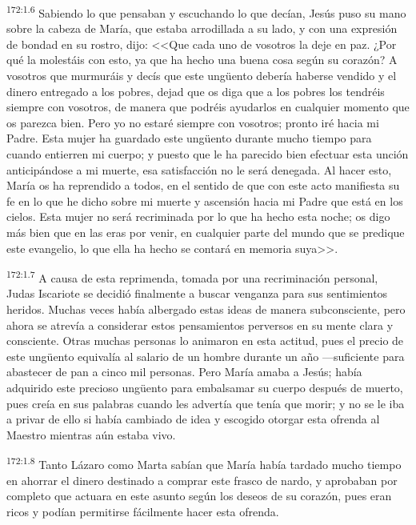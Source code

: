 \par 
\textsuperscript{172:1.6} Sabiendo lo que pensaban y escuchando lo que decían, Jesús puso su mano sobre la cabeza de María, que estaba arrodillada a su lado, y con una expresión de bondad en su rostro, dijo: <<Que cada uno de vosotros la deje en paz. ¿Por qué la molestáis con esto, ya que ha hecho una buena cosa según su corazón? A vosotros que murmuráis y decís que este ung\"uento debería haberse vendido y el dinero entregado a los pobres, dejad que os diga que a los pobres los tendréis siempre con vosotros, de manera que podréis ayudarlos en cualquier momento que os parezca bien. Pero yo no estaré siempre con vosotros; pronto iré hacia mi Padre. Esta mujer ha guardado este ung\"uento durante mucho tiempo para cuando entierren mi cuerpo; y puesto que le ha parecido bien efectuar esta unción anticipándose a mi muerte, esa satisfacción no le será denegada. Al hacer esto, María os ha reprendido a todos, en el sentido de que con este acto manifiesta su fe en lo que he dicho sobre mi muerte y ascensión hacia mi Padre que está en los cielos. Esta mujer no será recriminada por lo que ha hecho esta noche; os digo más bien que en las eras por venir, en cualquier parte del mundo que se predique este evangelio, lo que ella ha hecho se contará en memoria suya>>.

\par 
\textsuperscript{172:1.7} A causa de esta reprimenda, tomada por una recriminación personal, Judas Iscariote se decidió finalmente a buscar venganza para sus sentimientos heridos. Muchas veces había albergado estas ideas de manera subconsciente, pero ahora se atrevía a considerar estos pensamientos perversos en su mente clara y consciente. Otras muchas personas lo animaron en esta actitud, pues el precio de este ung\"uento equivalía al salario de un hombre durante un año ---suficiente para abastecer de pan a cinco mil personas. Pero María amaba a Jesús; había adquirido este precioso ung\"uento para embalsamar su cuerpo después de muerto, pues creía en sus palabras cuando les advertía que tenía que morir; y no se le iba a privar de ello si había cambiado de idea y escogido otorgar esta ofrenda al Maestro mientras aún estaba vivo.

\par 
\textsuperscript{172:1.8} Tanto Lázaro como Marta sabían que María había tardado mucho tiempo en ahorrar el dinero destinado a comprar este frasco de nardo, y aprobaban por completo que actuara en este asunto según los deseos de su corazón, pues eran ricos y podían permitirse fácilmente hacer esta ofrenda.

